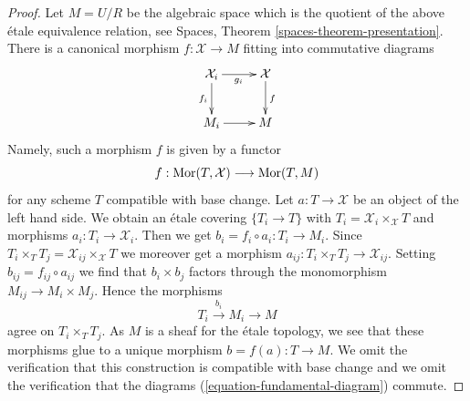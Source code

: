 \begin{proof}
\medskip\noindent
Let $M = U/R$ be the algebraic space which is the quotient of the above
\'etale equivalence relation, see
Spaces, Theorem \ref{spaces-theorem-presentation}.
There is a canonical morphism $f : \mathcal{X} \to M$
fitting into commutative diagrams
\begin{equation}
\label{equation-fundamental-diagram}
\xymatrix{
\mathcal{X}_i \ar[r]_{g_i} \ar[d]_{f_i} & \mathcal{X} \ar[d]^f \\
M_i \ar[r] & M
}
\end{equation}
Namely, such a morphism $f$ is given by a functor
$$
f : \mathop{\mathrm{Mor}}\nolimits(T, \mathcal{X}) \longrightarrow \mathop{\mathrm{Mor}}\nolimits(T, M)
$$
for any scheme $T$ compatible with base change. Let $a : T \to \mathcal{X}$
be an object of the left hand side. We obtain an \'etale covering
$\{T_i \to T\}$ with $T_i = \mathcal{X}_i \times_\mathcal{X} T$
and morphisms $a_i : T_i \to \mathcal{X}_i$. Then we get
$b_i = f_i \circ a_i : T_i \to M_i$. Since
$T_i \times_T T_j = \mathcal{X}_{ij} \times_\mathcal{X} T$
we moreover get a morphism $a_{ij} : T_i \times_T T_j \to \mathcal{X}_{ij}$.
Setting $b_{ij} = f_{ij} \circ a_{ij}$ we find that
$b_i \times b_j$ factors through the monomorphism
$M_{ij} \to M_i \times M_j$. Hence the morphisms
$$
T_i \xrightarrow{b_i} M_i \to M
$$
agree on $T_i \times_T T_j$. As $M$ is a sheaf for the \'etale
topology, we see that these morphisms glue to a unique
morphism $b = f(a) : T \to M$. We omit the verification that
this construction is compatible with base change and we omit
the verification that the diagrams
(\ref{equation-fundamental-diagram}) commute.


\end{proof}
